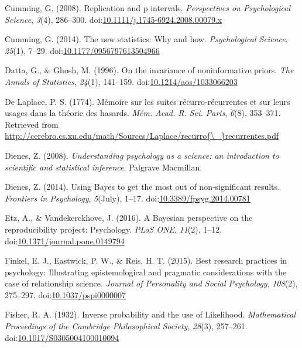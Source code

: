 \documentclass[english,mask,man]{apa6}
\theoremstyle{definition}
\theoremstyle{definition}
\theoremstyle{definition}
\theoremstyle{remark}
\begin{document}
\hypertarget{ref-Cumming2008}{}
Cumming, G. (2008). Replication and p intervals. \emph{Perspectives on
Psychological Science}, \emph{3}(4), 286--300.
doi:\href{https://doi.org/10.1111/j.1745-6924.2008.00079.x}{10.1111/j.1745-6924.2008.00079.x}

\hypertarget{ref-Cumming2014}{}
Cumming, G. (2014). The new statistics: Why and how. \emph{Psychological
Science}, \emph{25}(1), 7--29.
doi:\href{https://doi.org/10.1177/0956797613504966}{10.1177/0956797613504966}

\hypertarget{ref-Datta1996}{}
Datta, G., \& Ghosh, M. (1996). On the invariance of noninformative
priors. \emph{The Annals of Statistics}, \emph{24}(1), 141--159.
doi:\href{https://doi.org/10.1214/aos/1033066203}{10.1214/aos/1033066203}

\hypertarget{ref-DeLaplace1774}{}
De Laplace, P. S. (1774). Mémoire sur les suites récurro-récurrentes et
sur leurs usages dans la théorie des hasards. \emph{Mém. Acad. R. Sci.
Paris}, \emph{6}(8), 353--371. Retrieved from
\href{http://cerebro.cs.xu.edu/math/Sources/Laplace/recurro\%7B/_\%7Drecurrentes.pdf}{http://cerebro.cs.xu.edu/math/Sources/Laplace/recurro\{\textbackslash{}\_\}recurrentes.pdf}

\hypertarget{ref-Dienes2008}{}
Dienes, Z. (2008). \emph{Understanding psychology as a science: an
introduction to scientific and statistical inference}. Palgrave
Macmillan.

\hypertarget{ref-Dienes2014}{}
Dienes, Z. (2014). Using Bayes to get the most out of non-significant
results. \emph{Frontiers in Psychology}, \emph{5}(July), 1--17.
doi:\href{https://doi.org/10.3389/fpsyg.2014.00781}{10.3389/fpsyg.2014.00781}

\hypertarget{ref-Etz2016}{}
Etz, A., \& Vandekerckhove, J. (2016). A Bayesian perspective on the
reproducibility project: Psychology. \emph{PLoS ONE}, \emph{11}(2),
1--12.
doi:\href{https://doi.org/10.1371/journal.pone.0149794}{10.1371/journal.pone.0149794}

\hypertarget{ref-Finkel2015}{}
Finkel, E. J., Eastwick, P. W., \& Reis, H. T. (2015). Best research
practices in psychology: Illustrating epistemological and pragmatic
considerations with the case of relationship science. \emph{Journal of
Personality and Social Psychology}, \emph{108}(2), 275--297.
doi:\href{https://doi.org/10.1037/pspi0000007}{10.1037/pspi0000007}

\hypertarget{ref-Fisher1932}{}
Fisher, R. A. (1932). Inverse probability and the use of Likelihood.
\emph{Mathematical Proceedings of the Cambridge Philosophical Society},
\emph{28}(3), 257--261.
doi:\href{https://doi.org/10.1017/S0305004100010094}{10.1017/S0305004100010094}
\end{document}
